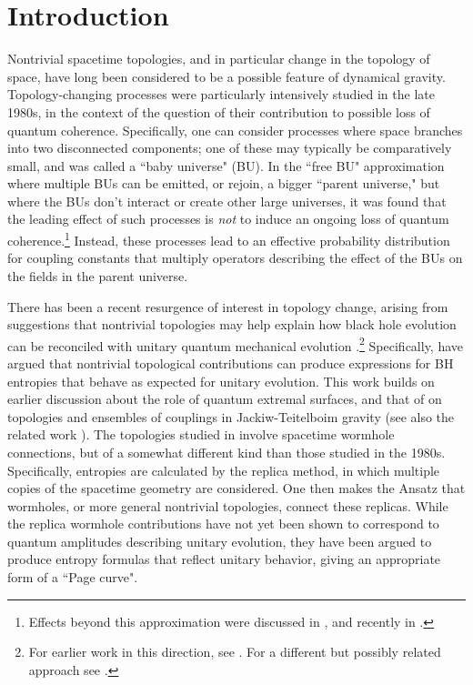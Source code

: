 \documentclass[12pt]{article}
\numberwithin{equation}{section}
\begin{document}
\section{Introduction}

Nontrivial spacetime topologies, and in particular change in the topology of space, have long been considered to be a possible feature of dynamical gravity.  Topology-changing processes were particularly intensively studied in the late 1980s, in the context of  the question of their contribution to possible loss of quantum coherence\cite{Lavrelashvili:1987jg,Hawking:1987mz,GiStAx,Cole,GiStInc}.  Specifically, one can consider processes where space branches into two disconnected components; one of these may typically be comparatively small, and was called a ``baby universe" (BU).  In the ``free BU" approximation where multiple BUs can be emitted, or rejoin, a bigger ``parent universe,"  but where the BUs don't interact or create other large universes, it was found that the leading effect of such processes is {\it not} to induce an ongoing loss of quantum coherence\cite{Cole,GiStInc}.\footnote{Effects beyond this approximation were discussed in \cite{GiSt3Q}, and recently in \cite{Marolf:2020xie}.}  Instead, these processes lead to an effective probability distribution for coupling constants that multiply operators describing the effect of the BUs on the fields in the parent universe.  

There has been a recent resurgence of interest in topology change, arising from suggestions that nontrivial topologies may help explain how black hole evolution can be reconciled with unitary quantum mechanical evolution \cite{Saad:2019lba, Penington:2019kki, Almheiri:2019qdq}.\footnote{For 
earlier work in this direction, see \cite{Polchinski:1994zs,AstroLH}.  For a different but possibly related approach see \cite{NVU,BHQU}.}  Specifically, \cite{Penington:2019kki, Almheiri:2019qdq} have argued that nontrivial topological contributions can produce expressions for BH entropies that behave as expected for unitary evolution\cite{Pageone,Page:1993wv}.  This work builds on earlier discussion\cite{Penington:2019npb, Almheiri:2019psf, Almheiri:2019hni} about the role of quantum extremal surfaces, and that of \cite{Saad:2019lba} on topologies and ensembles of couplings in Jackiw-Teitelboim gravity (see also the related work \cite{Maldacena:2019cbz, Cotler:2019nbi, Stanford:2019vob, Saad:2019pqd, Blommaert:2019wfy}).  The topologies studied in \cite{Almheiri:2019qdq, Penington:2019kki} involve spacetime wormhole connections, but of a somewhat different kind than those studied in the 1980s.  Specifically, entropies are calculated by the replica method\cite{CaWi}, in which multiple copies of the spacetime geometry are considered.  One then makes the Ansatz that wormholes, or more general nontrivial topologies, connect these replicas.  While the replica wormhole contributions have not yet been shown to correspond to quantum amplitudes describing unitary evolution, they have been argued to produce entropy formulas that reflect unitary behavior, giving an appropriate form of a ``Page curve"\cite{Pageone,Page:1993wv}.
\end{document}
